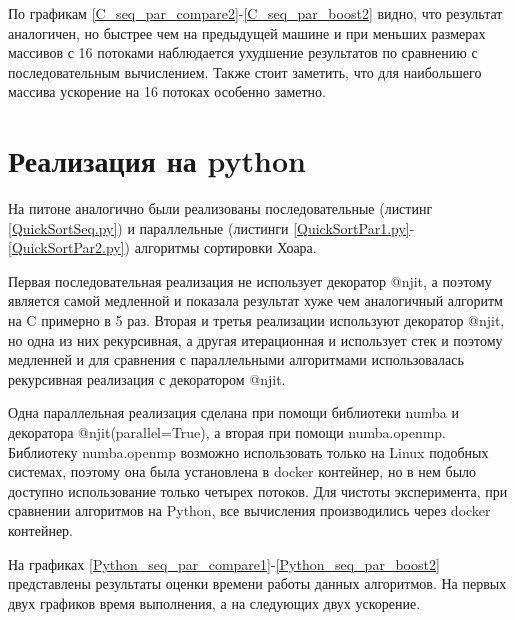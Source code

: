 \documentclass[a4paper,oneside,14pt]{extreport}
\begin{document}
По графикам \ref{C_seq_par_compare2}-\ref{C_seq_par_boost2} видно, что результат аналогичен, но быстрее чем на предыдущей машине и при меньших размерах массивов с 16 потоками наблюдается ухудшение результатов по сравнению с последовательным вычислением. Также стоит заметить, что для наибольшего массива ускорение на 16 потоках особенно заметно.

\section*{Реализация на python}

На питоне аналогично были реализованы последовательные (листинг \ref{QuickSortSeq.py}) и параллельные (листинги \ref{QuickSortPar1.py}-\ref{QuickSortPar2.py}) алгоритмы сортировки Хоара.

Первая последовательная реализация не использует декоратор @njit, а поэтому является самой медленной и показала результат хуже чем аналогичный алгоритм на C примерно в 5 раз. Вторая и третья реализации используют декоратор @njit, но одна из них рекурсивная, а другая итерационная и использует стек и поэтому медленней и для сравнения с параллельными алгоритмами использовалась рекурсивная реализация с декоратором @njit.

Одна параллельная реализация сделана при помощи библиотеки numba и декоратора @njit(parallel=True), а вторая при помощи numba.openmp. Библиотеку numba.openmp возможно использовать только на Linux подобных системах, поэтому она была установлена в docker контейнер, но в нем было доступно использование только четырех потоков. Для чистоты эксперимента, при сравнении алгоритмов на Python, все вычисления производились через docker контейнер.

На графиках \ref{Python_seq_par_compare1}-\ref{Python_seq_par_boost2} представлены результаты оценки времени работы данных алгоритмов. На первых двух графиков время выполнения, а на следующих двух ускорение.
\end{document}
